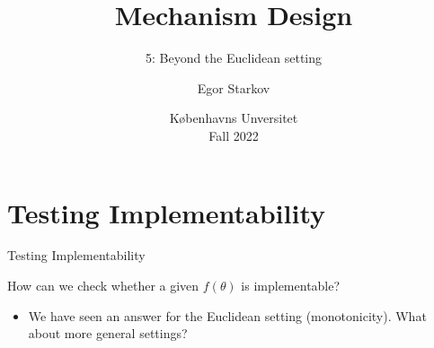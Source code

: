 \documentclass[english,10pt
,aspectratio=169
]{beamer}
\title{Mechanism Design}
\subtitle{5: Beyond the Euclidean setting}
\author{Egor Starkov}
\date{K{\o}benhavns Unversitet \\
	Fall 2022}
\begin{document}
	\frame[plain]{\titlepage}



\section{Testing Implementability}

\begin{frame}{Testing Implementability}
	\begin{exampleblock}{}
		How can we check whether a given $f(\theta)$ is implementable?
	\end{exampleblock} 
	\begin{itemize}
		\item We have seen an answer for the Euclidean setting (monotonicity). What about more general settings?
	\end{itemize}
\end{frame}


%		
\end{document}
